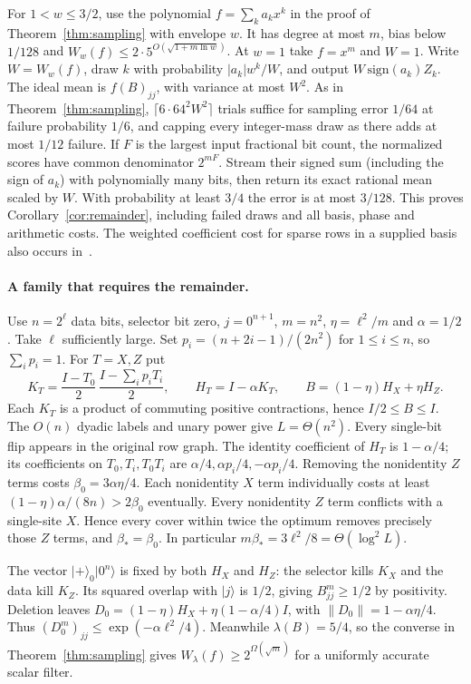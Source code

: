 \documentclass[11pt]{article}
\newcommand{\ket}[1]{\lvert #1\rangle}
\newcommand{\norm}[1]{\lVert #1\rVert}
\begin{document}
For \(1<w\le3/2\), use the polynomial \(f=\sum_k a_k x^k\) in the proof of Theorem~\ref{thm:sampling} with envelope \(w\). It has degree at most \(m\), bias below \(1/128\) and \(W_w(f)\le2\cdot5^{O(\sqrt{1+m\ln w})}\). At \(w=1\) take \(f=x^m\) and \(W=1\). Write \(W=W_w(f)\), draw \(k\) with probability \(|a_k|w^k/W\), and output \(W\,\mathrm{sign}(a_k)Z_k\). The ideal mean is \(f(B)_{jj}\), with variance at most \(W^2\). As in Theorem~\ref{thm:sampling}, \(\lceil6\cdot64^2W^2\rceil\) trials suffice for sampling error \(1/64\) at failure probability \(1/6\), and capping every integer-mass draw as there adds at most \(1/12\) failure. If \(F\) is the largest input fractional bit count, the normalized scores have common denominator \(2^{mF}\). Stream their signed sum (including the sign of \(a_k\)) with polynomially many bits, then return its exact rational mean scaled by \(W\). With probability at least \(3/4\) the error is at most \(3/128\). This proves Corollary~\ref{cor:remainder}, including failed draws and all basis, phase and arithmetic costs. The weighted coefficient cost for sparse rows in a supplied basis also occurs in~\cite[Prop.~5.5]{ms}.

\paragraph{A family that requires the remainder.}
Use \(n=2^\ell\) data bits, selector bit zero, \(j=0^{n+1}\), \(m=n^2\), \(\eta=\ell^2/m\) and \(\alpha=1/2\). Take \(\ell\) sufficiently large. Set \(p_i=(n+2i-1)/(2n^2)\) for \(1\le i\le n\), so \(\sum_i p_i=1\). For \(T=X,Z\) put
\[
 K_T=\frac{I-T_0}{2}\,\frac{I-\sum_i p_iT_i}{2},\qquad
 H_T=I-\alpha K_T,\qquad B=(1-\eta)H_X+\eta H_Z .
\]
Each \(K_T\) is a product of commuting positive contractions, hence \(I/2\le B\le I\). The \(O(n)\) dyadic labels and unary power give \(L=\Theta(n^2)\). Every single-bit flip appears in the original row graph. The identity coefficient of \(H_T\) is \(1-\alpha/4\); its coefficients on \(T_0,T_i,T_0T_i\) are \(\alpha/4,\alpha p_i/4,-\alpha p_i/4\). Removing the nonidentity \(Z\) terms costs \(\beta_0=3\alpha\eta/4\). Each nonidentity \(X\) term individually costs at least \((1-\eta)\alpha/(8n)>2\beta_0\) eventually. Every nonidentity \(Z\) term conflicts with a single-site \(X\). Hence every cover within twice the optimum removes precisely those \(Z\) terms, and \(\beta_*=\beta_0\). In particular \(m\beta_*=3\ell^2/8=\Theta(\log^2 L)\).

The vector \(\ket{+}_0\ket{0^n}\) is fixed by both \(H_X\) and \(H_Z\): the selector kills \(K_X\) and the data kill \(K_Z\). Its squared overlap with \(\ket j\) is \(1/2\), giving \(B^m_{jj}\ge1/2\) by positivity. Deletion leaves \(D_0=(1-\eta)H_X+\eta(1-\alpha/4)I\), with \(\norm{D_0}=1-\alpha\eta/4\). Thus \((D_0^m)_{jj}\le\exp(-\alpha\ell^2/4)\). Meanwhile \(\lambda(B)=5/4\), so the converse in Theorem~\ref{thm:sampling} gives \(W_{\lambda}(f)\ge 2^{\Omega(\sqrt m)}\) for a uniformly accurate scalar filter.
\end{document}
